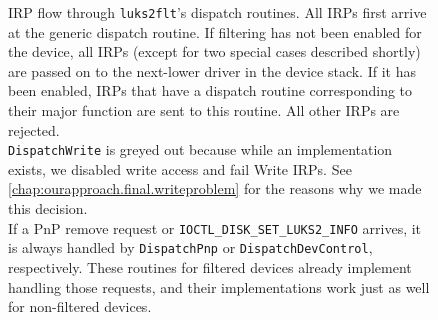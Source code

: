 \begin{figure}
	\center
	\small
	\caption[
		IRP flow through \texttt{luks2flt}'s dispatch routines
	]{
		IRP flow through \texttt{luks2flt}'s dispatch routines. All IRPs first arrive at the generic dispatch routine. If filtering has not been enabled for the device, all IRPs (except for two special cases described shortly) are passed on to the next-lower driver in the device stack. If it has been enabled, IRPs that have a dispatch routine corresponding to their major function are sent to this routine. All other IRPs are rejected.\\
		\texttt{DispatchWrite} is greyed out because while an implementation exists, we disabled write access and fail Write IRPs. See \autoref{chap:ourapproach.final.writeproblem} for the reasons why we made this decision.\\
		If a PnP remove request or \texttt{IOCTL\_DISK\_SET\_LUKS2\_INFO} arrives, it is always handled by \texttt{DispatchPnp} or \texttt{DispatchDevControl}, respectively. These routines for filtered devices already implement handling those requests, and their implementations work just as well for non-filtered devices.
	}
	\label{fig:ourapproach.final.irpdispatch}
\end{figure}

